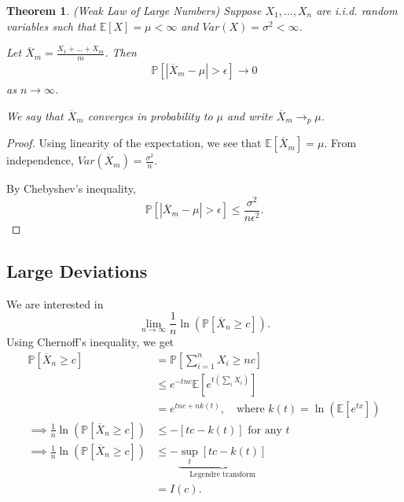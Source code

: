 \documentclass{tufte-handout}
\newcommand*\E{\mathbb{E}}
\renewcommand{\P}{\mathbb{P}}
\newtheorem{thm}{Theorem}[subsection]
\theoremstyle{definition}
\begin{document}
\begin{thm}
	(Weak Law of Large Numbers) Suppose $X_1,\ldots,X_n$ are i.i.d. random variables such that $\E\left[X\right] = \mu < \infty$ and $Var(X) = \sigma^2 < \infty$. 

	Let $\overline{X}_m = \frac{X_1 + \ldots + X_m}{m}$. Then 
	\begin{align*}
		\P\left[\left| \overline{X}_m - \mu \right| > \epsilon\right] \to 0
	\end{align*} as $n \to \infty$.

	We say that $\overline{X}_m $ converges in probability to $\mu$ and write $\overline{X}_m \to_p \mu$.
\end{thm}

\begin{proof}
	Using linearity of the expectation, we see that $\E\left[\overline{X}_m\right] = \mu$. From independence, $Var(\overline{X}_m) = \frac{\sigma^2}{n}$.

	By Chebyshev's inequality, \[
		\P\left[\left| \overline{X}_m - \mu \right| > \epsilon \right]  \le \frac{\sigma^2}{n \epsilon^2}
	.\] 

\end{proof}

\subsection{Large Deviations}

We are interested in \[
	\lim\limits_{n \to \infty} \frac{1}{n}\ln{(\P\left[\overline{X}_n \ge c\right] )}
.\] 
Using Chernoff's inequality, we get \begin{align*}
	\P\left[\overline{X}_n \ge c\right] &= \P\left[\sum\limits_{i=1}^{n} X_i \ge nc\right]  \\
										&\le e^{-tnc} \E\left[e^{t\left( \sum\limits_{i}^{} X_i \right)}\right] \\
										&= e^{tnc + nk(t)},\quad \text{where } k(t) = \ln{(\E\left[e^{tx}\right] )} \\
	\implies \frac{1}{n}\ln{(\P\left[\overline{X}_n \ge c\right] )} &\le -\left[ tc - k(t) \right] \text{ for any $t$ } \\
	\implies \frac{1}{n} \ln{(\P\left[\overline{X}_n \ge c\right])} &\le - \underbrace{\sup\limits_t \left[ tc - k(t) \right]}_{\text{Legendre transform}} \\
																	&= I(c)
.\end{align*}
\end{document}
